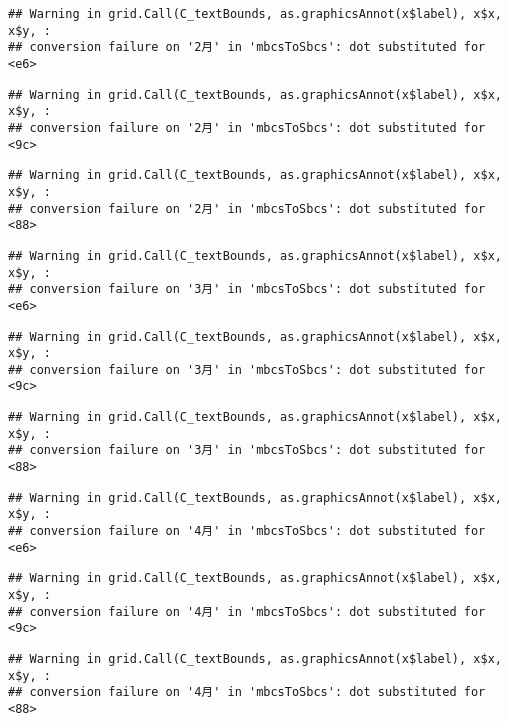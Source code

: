 \documentclass[]{ctexart}
\begin{document}
\begin{verbatim}
## Warning in grid.Call(C_textBounds, as.graphicsAnnot(x$label), x$x, x$y, :
## conversion failure on '2月' in 'mbcsToSbcs': dot substituted for <e6>
\end{verbatim}

\begin{verbatim}
## Warning in grid.Call(C_textBounds, as.graphicsAnnot(x$label), x$x, x$y, :
## conversion failure on '2月' in 'mbcsToSbcs': dot substituted for <9c>
\end{verbatim}

\begin{verbatim}
## Warning in grid.Call(C_textBounds, as.graphicsAnnot(x$label), x$x, x$y, :
## conversion failure on '2月' in 'mbcsToSbcs': dot substituted for <88>
\end{verbatim}

\begin{verbatim}
## Warning in grid.Call(C_textBounds, as.graphicsAnnot(x$label), x$x, x$y, :
## conversion failure on '3月' in 'mbcsToSbcs': dot substituted for <e6>
\end{verbatim}

\begin{verbatim}
## Warning in grid.Call(C_textBounds, as.graphicsAnnot(x$label), x$x, x$y, :
## conversion failure on '3月' in 'mbcsToSbcs': dot substituted for <9c>
\end{verbatim}

\begin{verbatim}
## Warning in grid.Call(C_textBounds, as.graphicsAnnot(x$label), x$x, x$y, :
## conversion failure on '3月' in 'mbcsToSbcs': dot substituted for <88>
\end{verbatim}

\begin{verbatim}
## Warning in grid.Call(C_textBounds, as.graphicsAnnot(x$label), x$x, x$y, :
## conversion failure on '4月' in 'mbcsToSbcs': dot substituted for <e6>
\end{verbatim}

\begin{verbatim}
## Warning in grid.Call(C_textBounds, as.graphicsAnnot(x$label), x$x, x$y, :
## conversion failure on '4月' in 'mbcsToSbcs': dot substituted for <9c>
\end{verbatim}

\begin{verbatim}
## Warning in grid.Call(C_textBounds, as.graphicsAnnot(x$label), x$x, x$y, :
## conversion failure on '4月' in 'mbcsToSbcs': dot substituted for <88>
\end{verbatim}
\end{document}
